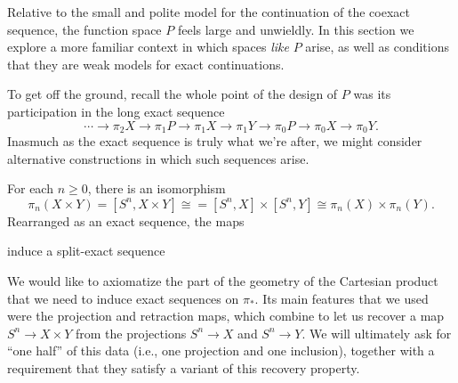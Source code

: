
Relative to the small and polite model for the continuation of the coexact sequence, the function space $P$ feels large and unwieldly.
In this section we explore a more familiar context in which spaces \emph{like} $P$ arise, as well as conditions that they are weak models for exact continuations.

To get off the ground, recall the whole point of the design of $P$ was its participation in the long exact sequence%
\[\cdots \to \pi_2 X \to \pi_1 P \to \pi_1 X \to \pi_1 Y \to \pi_0 P \to \pi_0 X \to \pi_0 Y.\]
Inasmuch as the exact sequence is truly what we're after, we might consider alternative constructions in which such sequences arise.

\begin{example}
For each $n \ge 0$, there is an isomorphism \[\pi_n(X \times Y) = [S^n, X \times Y] \cong = [S^n, X] \times [S^n, Y] \cong \pi_n(X) \times \pi_n(Y).\]
Rearranged as an exact sequence, the maps
\begin{center}
\end{center}
induce a split-exact sequence
\begin{center}
\end{center}
\end{example}

\noindent
We would like to axiomatize the part of the geometry of the Cartesian product that we need to induce exact sequences on $\pi_*$.
Its main features that we used were the projection and retraction maps, which combine to let us recover a map $S^n \to X \times Y$ from the projections $S^n \to X$ and $S^n \to Y$.
We will ultimately ask for ``one half'' of this data (i.e., one projection and one inclusion), together with a requirement that they satisfy a variant of this recovery property.


